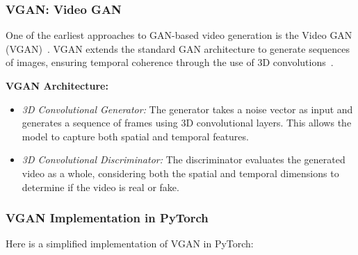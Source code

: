 \subsubsection{VGAN: Video GAN}
One of the earliest approaches to GAN-based video generation is the Video GAN (VGAN)~\cite{aldausari2022video}. VGAN extends the standard GAN architecture to generate sequences of images, ensuring temporal coherence through the use of 3D convolutions~\cite{brooks2022generating}.

\textbf{VGAN Architecture:}
\begin{itemize}
    \item \textit{3D Convolutional Generator:} The generator takes a noise vector as input and generates a sequence of frames using 3D convolutional layers. This allows the model to capture both spatial and temporal features.
    \item \textit{3D Convolutional Discriminator:} The discriminator evaluates the generated video as a whole, considering both the spatial and temporal dimensions to determine if the video is real or fake.
\end{itemize}

\subsubsection{VGAN Implementation in PyTorch}
Here is a simplified implementation of VGAN in PyTorch:

